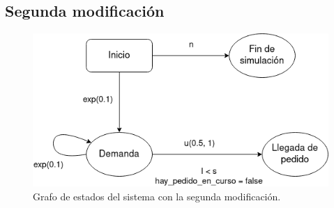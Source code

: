 \documentclass[12pt, spanish]{article}
\begin{document}
\subsection{Segunda modificación}



\begin{figure}[H]
  \centering
   \includegraphics[width=\textwidth]{grafo_sucesos_mod2.png}
	\caption{Grafo de estados del sistema con la segunda modificación.}
\end{figure}
\end{document}
